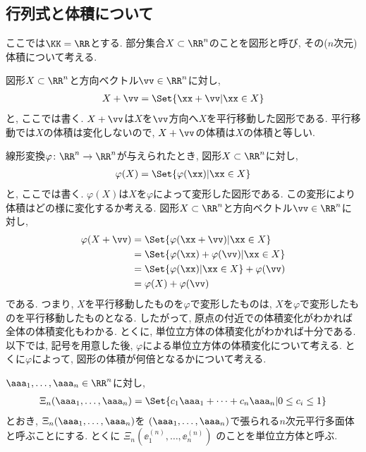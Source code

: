 \subsection{行列式と体積について}
ここでは$\KK=\RR$とする.
部分集合$X\subset\RR^n$のことを図形と呼び,
その($n$次元)体積について考える.

図形$X\subset \RR^n$と方向ベクトル$\vv\in\RR^n$に対し,
\begin{align*}
  X+\vv=\Set{\xx+\vv|\xx\in X}
\end{align*}
と,
ここでは書く.
$X+\vv$は$X$を$\vv$方向へ$X$を平行移動した図形である.
平行移動では$X$の体積は変化しないので,
$X+\vv$の体積は$X$の体積と等しい.

線形変換$\varphi\colon \RR^n\to \RR^n$が与えられたとき,
図形$X\subset \RR^n$に対し,
\begin{align*}
  \varphi(X)=\Set{\varphi(\xx)|\xx\in X}
\end{align*}
と, ここでは書く.
$\varphi(X)$は$X$を$\varphi$によって変形した図形である.
この変形により体積はどの様に変化するか考える.
図形$X\subset \RR^n$と方向ベクトル$\vv\in\RR^n$に対し,
\begin{align*}
  \varphi(X+\vv)
  &=\Set{\varphi(\xx+\vv)|\xx\in X}\\
  &=\Set{\varphi(\xx)+\varphi(\vv)|\xx\in X}\\
  &=\Set{\varphi(\xx)|\xx\in X}+\varphi(\vv)\\
  &=\varphi(X)+\varphi(\vv)
\end{align*}
である.
つまり,
$X$を平行移動したものを$\varphi$で変形したものは,
$X$を$\varphi$で変形したものを平行移動したものとなる.
したがって,
原点の付近での体積変化がわかれば全体の体積変化もわかる.
とくに, 単位立方体の体積変化がわかれば十分である.
以下では, 記号を用意した後,
$\varphi$による単位立方体の体積変化について考える.
とくに$\varphi$によって, 図形の体積が何倍となるかについて考える.

$\aaa_1,\ldots,\aaa_n\in\RR^n$に対し,
\begin{align*}
  \Xi_n(\aaa_1,\ldots,\aaa_n)
  =\Set{c_1\aaa_1+\cdots+c_n\aaa_n|0\leq c_i\leq 1}
\end{align*}
とおき,
$\Xi_n(\aaa_1,\ldots,\aaa_n)$を
$(\aaa_1,\ldots,\aaa_n)$で張られる$n$次元平行多面体と呼ぶことにする.
とくに
$\Xi_n(\ee^{(n)}_1,\ldots,\ee^{(n)}_n)$
のことを単位立方体と呼ぶ.


